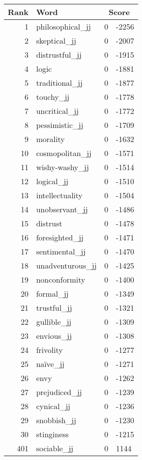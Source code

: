 \begin{longtable}[!htbp]{| rlr@{.}l |}
    \hline
    \textbf{Rank} & \textbf{Word} & \multicolumn{2}{c|}{\textbf{Score}} \\
    \hline
    \endhead
    1 & philosophical\_jj & 0 & -2256 \\
    2 & skeptical\_jj & 0 & -2007 \\
    3 & distrustful\_jj & 0 & -1915 \\
    4 & logic & 0 & -1881 \\
    5 & traditional\_jj & 0 & -1877 \\
    6 & touchy\_jj & 0 & -1778 \\
    7 & uncritical\_jj & 0 & -1772 \\
    8 & pessimistic\_jj & 0 & -1709 \\
    9 & morality & 0 & -1632 \\
    10 & cosmopolitan\_jj & 0 & -1571 \\
    11 & wishy-washy\_jj & 0 & -1514 \\
    12 & logical\_jj & 0 & -1510 \\
    13 & intellectuality & 0 & -1504 \\
    14 & unobservant\_jj & 0 & -1486 \\
    15 & distrust & 0 & -1478 \\
    16 & foresighted\_jj & 0 & -1471 \\
    17 & sentimental\_jj & 0 & -1470 \\
    18 & unadventurous\_jj & 0 & -1425 \\
    19 & nonconformity & 0 & -1400 \\
    20 & formal\_jj & 0 & -1349 \\
    21 & trustful\_jj & 0 & -1321 \\
    22 & gullible\_jj & 0 & -1309 \\
    23 & envious\_jj & 0 & -1308 \\
    24 & frivolity & 0 & -1277 \\
    25 & naïve\_jj & 0 & -1271 \\
    26 & envy & 0 & -1262 \\
    27 & prejudiced\_jj & 0 & -1239 \\
    28 & cynical\_jj & 0 & -1236 \\
    29 & snobbish\_jj & 0 & -1230 \\
    30 & stinginess & 0 & -1215 \\
    401 & sociable\_jj & 0 & 1144 \\

\end{longtable}
